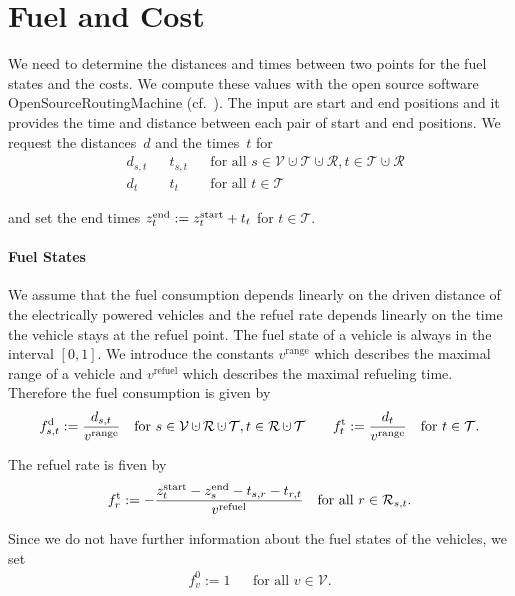 \section{Fuel and Cost}
\label{sec:fuel_cost}

We need to determine the distances and times between two points for the fuel states and the costs. We compute these values with the open source software Open\-Source\-Routing\-Machine (cf.~\cite{OSRM}). The input are start and end positions and it provides the time and distance between each pair of start and end positions. We request the distances~$d$ and the times~$t$ for
\begin{align*}
	& d_{s,t} && t_{s,t} && \text{for all } s\in\mathcal{V}\cupdot\mathcal{T}\cupdot\mathcal{R}, t\in\mathcal{T}\cupdot\mathcal{R} \\
	& d_t && t_t && \text{for all } t\in\mathcal{T}
\end{align*}

and set the end times ${z^{\operatorname{end}}_t := z^{\operatorname{start}}_t + t_t}$ for ${t\in\mathcal{T}}$.

\paragraph{Fuel States} \parfill

We assume that the fuel consumption depends linearly on the driven distance of the electrically powered vehicles and the refuel rate depends linearly on the time the vehicle stays at the refuel point. The fuel state of a vehicle is always in the interval $[0,1]$. We introduce the constants $v^{\operatorname{range}}$ which describes the maximal range of a vehicle and $v^{\operatorname{refuel}}$ which describes the maximal refueling time. Therefore the fuel consumption is given by
\begin{align*}
	\fd_{s,t} := \frac{d_{s,t}}{v^{\operatorname{range}}} && \text{for } s\in\mathcal{V}\cupdot\mathcal{R}\cupdot\mathcal{T}, t\in\mathcal{R}\cupdot\mathcal{T} && && \ft_t := \frac{d_t}{v^{\operatorname{range}}} && \text{for } t\in\mathcal{T}.
\end{align*}

The refuel rate is fiven by
\begin{align*}
	f^{\operatorname{t}}_r := -\frac{z^{\operatorname{start}}_t - z^{\operatorname{end}}_s - t_{s,r} - t_{r,t}}{v^{\operatorname{refuel}}} && \text{for all } r\in\mathcal{R}_{s,t}.
\end{align*}

Since we do not have further information about the fuel states of the vehicles, we set
\begin{align*}
	f^0_v := 1 && \text{for all } v\in\mathcal{V}.
\end{align*}

